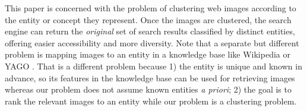 %
%


This paper is concerned with the problem of clustering web images
according to the entity or concept they represent.
Once the images are clustered, the search engine can
return the {\em original} set of search results classified by distinct entities,
offering easier accessibility and more diversity.
Note that a separate but different problem \cite{Taneva10,Taneva11}
is mapping images to an entity in a knowledge base like Wikipedia or
YAGO \cite{SuchanekKW07}. That is a different problem because
1) the entity is unique and known in advance, so its features in the knowledge base
can be used for retrieving images whereas our problem does not assume known entities
{\em a priori};
2) the goal is to rank the relevant images to an entity while our problem
is a clustering problem.

